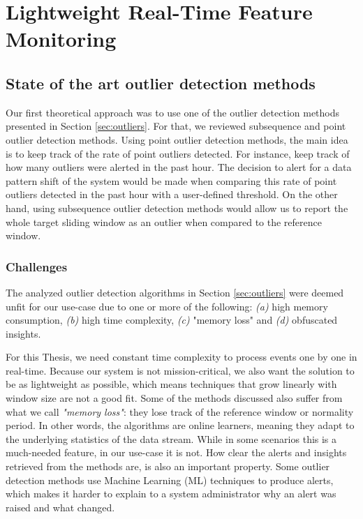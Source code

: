 \chapter{Lightweight Real-Time Feature Monitoring} \label{chap:my-work} \minitoc

\section{State of the art outlier detection methods}
Our first theoretical approach was to use one of the outlier detection methods presented in Section \ref{sec:outliers}. For that, we reviewed subsequence and point outlier detection methods. Using point outlier detection methods, the main idea is to keep track of the rate of point outliers detected. For instance, keep track of how many outliers were alerted in the past hour. The decision to alert for a data pattern shift of the system would be made when comparing this rate of point outliers detected in the past hour with a user-defined threshold. On the other hand, using subsequence outlier detection methods would allow us to report the whole target sliding window as an outlier when compared to the reference window. 


\subsection*{Challenges}
The analyzed outlier detection algorithms in Section \ref{sec:outliers} were deemed unfit for our use-case due to one or more of the following: \textit{(a)} high memory consumption, \textit{(b)} high time complexity, \textit{(c)} "memory loss" and \textit{(d)} obfuscated insights.

For this Thesis, we need constant time complexity to process events one by one in real-time. Because our system is not mission-critical, we also want the solution to be as lightweight as possible, which means techniques that grow linearly with window size are not a good fit. Some of the methods discussed also suffer from what we call \textit{"memory loss"}: they lose track of the reference window or normality period. In other words, the algorithms are online learners, meaning they adapt to the underlying statistics of the data stream. While in some scenarios this is a much-needed feature, in our use-case it is not. How clear the alerts and insights retrieved from the methods are, is also an important property. Some outlier detection methods use Machine Learning (ML) techniques to produce alerts, which makes it harder to explain to a system administrator why an alert was raised and what changed.

